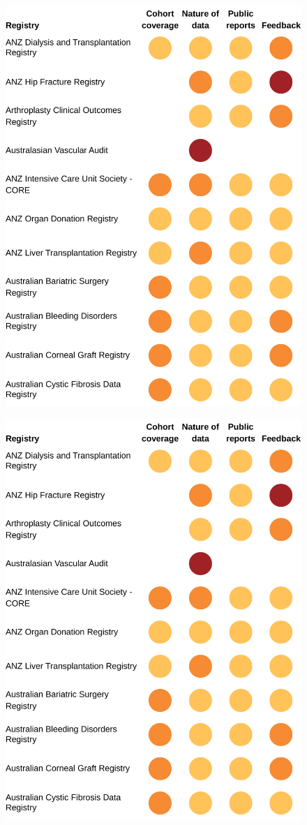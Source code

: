 \documentclass[FrontPage]{grattan}
\begin{document}
\begin{figure}
\includegraphics[page=3]{atlas/Registry_graphs.pdf}
\end{figure}

\begin{figure}
\includegraphics[page=4]{atlas/Registry_graphs.pdf}
\end{figure}

\printbibliography
\end{document}
